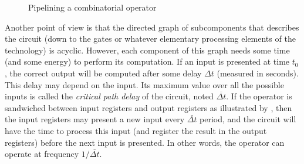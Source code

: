\documentclass{article}
\begin{document}
\begin{figure}
{{
    }
  }
  \caption{Pipelining a combinatorial operator}
  \label{fig:flopoco:genericpipe}
\end{figure}

Another point of view is that the directed graph of subcomponents that describes the circuit (down to the gates or whatever elementary processing elements of the technology) is acyclic.
However, each component of this graph needs some time (and some energy) to perform its computation.
If an input is presented at time $t_0$, the correct output will be computed after some delay $\Delta t$ (measured in seconds).
This delay may depend on the input.
Its maximum value over all the possible inputs is called the \emph{critical path delay} of the circuit, noted $\overline{\Delta t}$.
If the operator is sandwiched between input registers and output registers as illustrated by , then the input registers may present a new input every $\overline{\Delta t}$ period, and the circuit will have the time to process this input (and register the result in the output registers) before the next input is presented.
In other words, the operator can operate at frequency $1/\overline{\Delta t}$.
\end{document}
